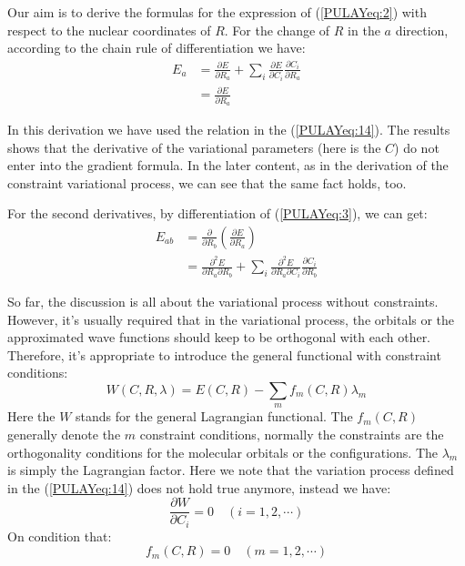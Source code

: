 Our aim is to derive the formulas for the expression of
(\ref{PULAYeq:2}) with respect to the nuclear coordinates of $R$.  For
the change of $R$ in the $a$ direction, according to the chain rule of
differentiation we have:
\begin{align}\label{PULAYeq:3}
  E_{a} &= \frac{\partial E}{\partial R_{a}} +\sum_{i}\frac{\partial
    E}{\partial C_{i}}\frac{\partial
    C_{i}}{\partial R_{a}} \nonumber \\
  &= \frac{\partial E}{\partial R_{a}}
\end{align}

In this derivation we have used the relation in the
(\ref{PULAYeq:14}). The results shows that the derivative of the
variational parameters (here is the $C$) do not enter into the
gradient formula. In the later content, as in the derivation of the
constraint variational process, we can see that the same fact holds,
too.

For the second derivatives, by differentiation of (\ref{PULAYeq:3}),
we can get:
\begin{align}\label{}
  E_{ab} &=\frac{\partial}{\partial R_{b}}\left(\frac{\partial
      E}{\partial
      R_{a}}\right) \nonumber \\
  &=\frac{\partial^{2} E}{\partial R_{a}\partial R_{b}}
  +\sum_{i}\frac{\partial^{2} E}{\partial R_{a}\partial
    C_{i}}\frac{\partial C_{i}}{\partial R_{b}}
\end{align}

So far, the discussion is all about the variational process without
constraints. However, it's usually required that in the variational
process, the orbitals or the approximated wave functions should keep
to be orthogonal with each other. Therefore, it's appropriate to
introduce the general functional with constraint conditions:
\begin{equation}\label{PULAYeq:8}
  W(C, R, \lambda) = E(C,R) - \sum_{m}f_{m}(C,R)\lambda_{m}
\end{equation}
Here the $W$ stands for the general Lagrangian functional. The
$f_{m}(C,R)$ generally denote the $m$ constraint conditions, normally
the constraints are the orthogonality conditions for the molecular
orbitals or the configurations. The $\lambda_{m}$ is simply the
Lagrangian factor. Here we note that the variation process defined in
the (\ref{PULAYeq:14}) does not hold true anymore, instead we have:
\begin{equation}\label{PULAYeq:5}
  \frac{\partial W}{\partial C_{i}} = 0 \quad (i=1,2, \cdots)
\end{equation}
On condition that:
\begin{equation}\label{PULAYeq:15}
  f_{m}(C,R) =  0 \quad (m=1,2, \cdots)
\end{equation}

